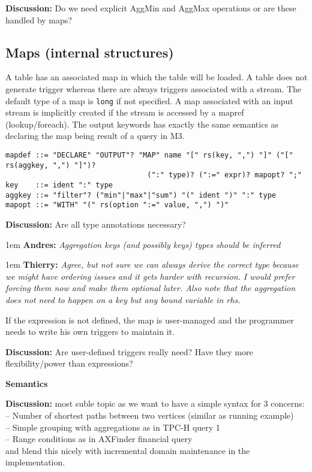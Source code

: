 \documentclass[11pt]{article}
\newlength{\dlen}
\def\discuss#1{\par\hspace{2em}
\setlength{\dlen}{\textwidth}
\addtolength{\dlen}{-2em}
\begin{minipage}{\dlen}\footnotesize {\bf\color{red} Discussion:} #1\end{minipage}\par}
\def\say#1#2{\begingroup\par\leftskip1em {\bf #1:} \it #2\par\endgroup}
\begin{document}
\discuss{Do we need explicit AggMin and AggMax operations or are these handled by maps?}

\subsection{Maps (internal structures)}
A table has an associated map in which the table will be loaded. A table does not generate trigger whereas there are always triggers associated with a stream. The default type of a map is {\tt long} if not specified. A map associated with an input stream is implicitly created if the stream is accessed by a mapref (lookup/foreach). The output keywords has exactly the same semantics as declaring the map being result of a query in M3.

\begin{verbatim}
mapdef ::= "DECLARE" "OUTPUT"? "MAP" name "[" rs(key, ",") "]" ("[" rs(aggkey, ",") "]")? 
                                 (":" type)? (":=" expr)? mapopt? ";" 
key    ::= ident ":" type
aggkey ::= "filter"? ("min"|"max"|"sum") "(" ident ")" ":" type
mapopt ::= "WITH" "(" rs(option ":=" value, ",") ")"
\end{verbatim}
\discuss{Are all type annotations necessary?
	\say{Andres}{Aggregation keys (and possibly keys) types should be inferred}
	\say{Thierry}{Agree, but not sure we can always derive the correct type because we might have ordering issues and it gets harder with recursion. I would prefer forcing them now and make them optional later. Also note that the aggregation does not need to happen on a key but any bound variable in rhs.}}

If the expression is not defined, the map is user-managed and the programmer needs to write his own triggers to maintain it.
\discuss{Are user-defined triggers really need? Have they more flexibility/power than expressions?}

{\bf Semantics}
\discuss{most suble topic as we want to have a simple syntax for 3 concerns:\\
-- Number of shortest paths between two vertices (similar as \cite{socialite} running example)\\
-- Simple grouping with aggregations as in TPC-H query 1\\
-- Range conditions as in AXFinder financial query\\
and blend this nicely with incremental domain maintenance in the implementation.}
\end{document}
